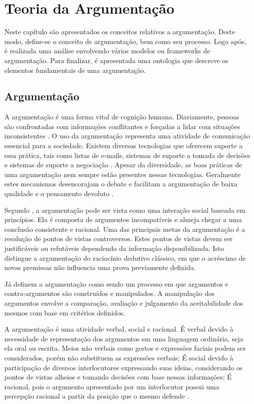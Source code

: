 \chapter{Teoria da Argumentação}

Neste capítulo são apresentados os conceitos relativos a argumentação. Deste modo, define-se o conceito de argumentação, bem como seu processo. Logo após, é realizada uma análise envolvendo vários modelos ou frameworks de argumentação. Para finalizar, é apresentada uma ontologia que descreve os elementos fundamentais de uma argumentação.

\section{Argumentação}

A argumentação é uma forma vital de cognição humana. Diariamente, pessoas são confrontadas com informações conflitantes e forçadas a lidar com situações inconsistentes \cite{besnard_elements_2008}. O uso da argumentação representa uma atividade de comunicação essencial para a sociedade. Existem diversas tecnologias que oferecem suporte a essa prática, tais como listas de e-mails, sistemas de suporte a tomada de decisões e sistemas de suporte a negociação \cite{moor2006AST}. Apesar da diversidade, as boas práticas de uma argumentação nem sempre estão presentes nessas tecnologias. Geralmente estes mecanismos desencorajam o debate e facilitam a argumentação de baixa qualidade e o pensamento devoluto \cite{bex_implementing_2013}.

Segundo , a argumentação pode ser vista como uma interação social baseada em princípios. Ela é composta de argumentos incompatíveis e almeja chegar a uma conclusão consistente e racional. Uma das principais metas da argumentação é a resolução de pontos de vistas controversos. Estes pontos de vistas devem ser justificáveis ou refutáveis dependendo da informação disponibilizada. Isto distingue a argumentação do raciocínio dedutivo clássico, em que o acréscimo de novas premissas não influencia uma prova previamente definida. 

Já  definem a argumentação como sendo um processo em que argumentos e contra-argumentos são construídos e manipulados. A manipulação dos argumentos envolve a comparação, avaliação e julgamento da aceitabilidade dos mesmos com base em critérios definidos.

A argumentação é uma atividade verbal, social e racional.  É verbal devido à necessidade de representação dos argumentos em uma linguagem ordinária, seja ela oral ou escrita. Meios não verbais como gestos e expressões faciais podem ser considerados, porém não substituem as expressões verbais; É social devido à participação de diversos interlocutores expressando suas ideias, considerando os pontos de vistas alheios e tomando decisões com base nessas informações; É racional, pois o argumento apresentado por um interlocutor possui uma percepção racional a partir da posição que o mesmo defende \cite{eemeren1996argumentation}.

